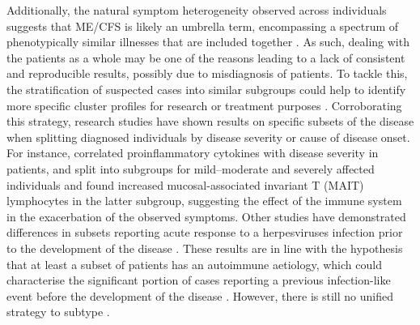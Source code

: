 Additionally, the natural symptom heterogeneity observed across \cfs individuals suggests that ME/CFS is likely an umbrella term, encompassing a spectrum of phenotypically similar illnesses that are included together \citep{malato2023ImpactMisdiagnosis}.
As such, dealing with the patients as a whole may be one of the reasons leading to a lack of consistent and reproducible results, possibly due to misdiagnosis of patients.
To tackle this, the stratification of suspected cases into similar subgroups could help to identify more specific cluster profiles for research or treatment purposes \citep{jason2005ChronicFatigue, scheibenbogen2017EuropeanME}.
Corroborating this strategy, research studies have shown results on specific subsets of the disease when splitting diagnosed individuals by disease severity or cause of disease onset.
For instance, \citet{montoyaCytokineSignatureAssociated2017} correlated proinflammatory cytokines with disease severity in patients, and \citet{cliff2019CellularImmune} split \cfs into subgroups for mild--moderate and severely affected individuals and found increased mucosal-associated invariant T (MAIT) lymphocytes in the latter subgroup, suggesting the effect of the immune system in the exacerbation of the observed symptoms.
Other studies have demonstrated differences in subsets reporting acute response to a herpesviruses infection prior to the development of the disease \citep{domingues2021HerpesvirusesSerologya, sepulveda2022RevisitingIgG, domingues2023AssociationAnalysis}.
These results are in line with the hypothesis that at least a subset of \cfs patients has an autoimmune aetiology, which could characterise the significant portion of cases reporting a previous infection-like event before the development of the disease \citep{sotznyMyalgicEncephalomyelitisChronic2018}.
However, there is still no unified strategy to subtype \cfs \citep{jason2005ChronicFatigue}.


